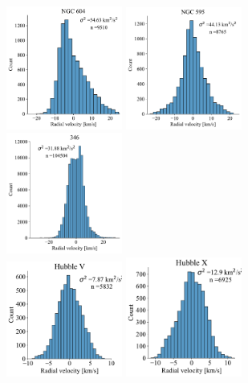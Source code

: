 \documentclass[fleqn,usenatbib, useAMS, a4paper]{mnras}
\begin{document}
\begin{figure}
\centering
\begin{multicols}{3}
\includegraphics[width=1.5in]{Figures/Hist/604}\par
\includegraphics[width=1.5in]{Figures/Hist/595}\par
\includegraphics[width=1.5in]{Figures/Hist/346}\par
\end{multicols}
\begin{multicols}{3}
\includegraphics[width=1.5in]{Figures/Hist/Hubble V}\par
\includegraphics[width=1.5in]{Figures/Hist/Hubble X}\par

\end{multicols}
\end{figure}
\end{document}
